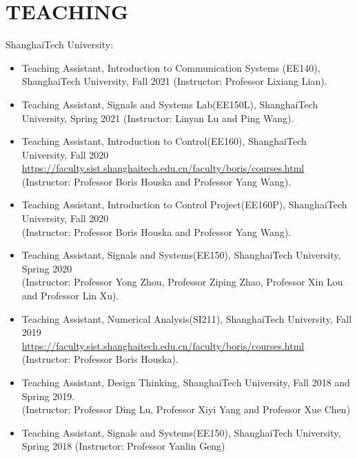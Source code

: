 \documentclass[paper=a4,fontsize=11pt]{scrartcl} %
\newlength{\spacebox}
\newcommand{\NewPart}[1]{\section*{\uppercase{#1}}}
\newcommand{\PersonalEntry}[2]{
		\noindent\hangindent=2em\hangafter=0 %
		\parbox{\spacebox}{        %
		\textit{#1}}		       %
		\hspace{1.5em} #2 \par}    %
\newcommand{\SkillsEntry}[2]{      %
		\noindent\hangindent=2em\hangafter=0 %
		\parbox{\spacebox}{        %
		\textit{#1}}			   %
		\hspace{1.5em} #2 \par}    %
\begin{document}
\NewPart{Teaching}

ShanghaiTech University:
\begin{itemize}
	
	
	\item{Teaching Assistant, 	Introduction to Communication Systems (EE140), ShanghaiTech University, Fall 2021 (Instructor: Professor Lixiang Lian).}
	
	\item{Teaching Assistant, Signals and Systems Lab(EE150L), ShanghaiTech University, Spring 2021 (Instructor: Linyan Lu and Ping Wang).}
	
	\item{Teaching Assistant, Introduction to Control(EE160), ShanghaiTech University, Fall 2020\\ 
		\url{https://faculty.sist.shanghaitech.edu.cn/faculty/boris/courses.html}\\
		(Instructor: Professor Boris Houska and Professor Yang Wang).
	}
	
	\item{Teaching Assistant, Introduction to Control Project(EE160P), ShanghaiTech University, Fall 2020\\ (Instructor: Professor Boris Houska and Professor Yang Wang).}
	
	\item{Teaching Assistant, Signals and Systems(EE150),  ShanghaiTech University, Spring 2020 \\ (Instructor: Professor Yong Zhou, Professor Ziping Zhao, Professor Xin Lou and Professor Lin Xu).}
	
	\item{Teaching Assistant, Numerical Analysis(SI211), ShanghaiTech University, Fall 2019\\ 
		\url{https://faculty.sist.shanghaitech.edu.cn/faculty/boris/courses.html}\\
		(Instructor: Professor Boris Houska).
	}
	
	\item{Teaching Assistant, Design Thinking, ShanghaiTech University, Fall 2018 and Spring 2019.\\ (Instructor: Professor Ding Lu, Professor Xiyi Yang and Professor Xue Chen) }
	
	\item{Teaching Assistant, Signals and Systems(EE150),  ShanghaiTech University, Spring 2018 (Instructor: Professor Yanlin Geng)
		
		}


	
\end{itemize}
\end{document}
